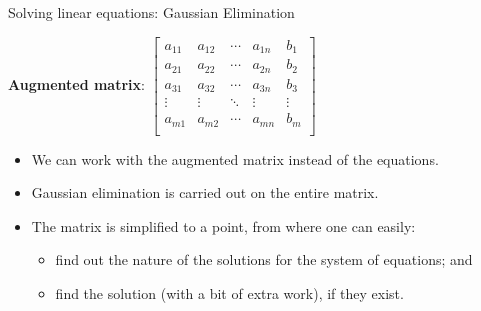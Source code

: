 \documentclass[aspectratio=169]{beamer}
\begin{document}
\begin{frame}[t]{Solving linear equations: Gaussian Elimination}
\begin{center}
\textbf{Augmented matrix}: $\left[
\begin{array}{cccc|c}
a_{11} & a_{12} & \cdots & a_{1n} & b_1 \\
a_{21} & a_{22} & \cdots & a_{2n} & b_2 \\
a_{31} & a_{32} & \cdots & a_{3n} & b_3 \\
\vdots & \vdots & \ddots & \vdots & \vdots \\
a_{m1} & a_{m2} & \cdots & a_{mn} & b_m \\
\end{array}
\right]$
\vspace{0.5cm}
\begin{itemize}
\item We can work with the augmented matrix instead of the equations.
\item Gaussian elimination is carried out on the entire matrix.
\item The matrix is simplified to a point, from where one can easily:
\begin{itemize}
\item find out the nature of the solutions for the system of equations; and
\item find the solution (with a bit of extra work), if they exist.
\end{itemize}
\end{itemize}
\end{center}
\end{frame}
\end{document}
